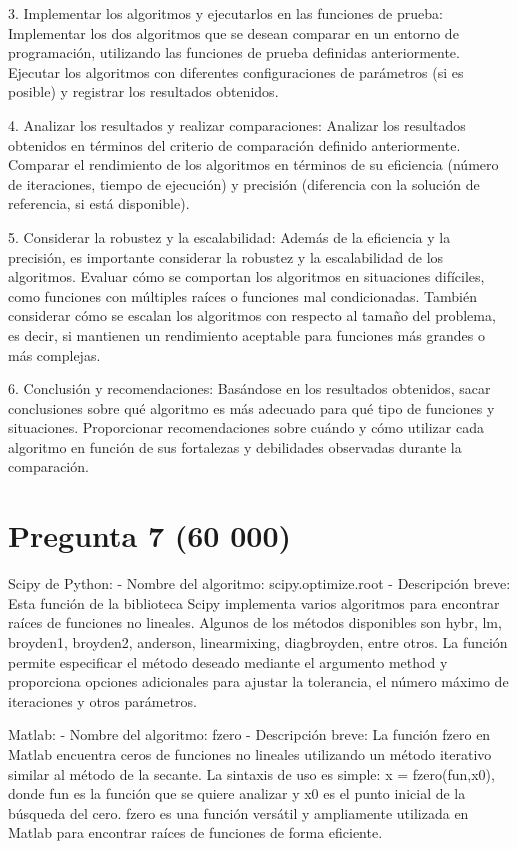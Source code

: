 \documentclass[a4paper,12pt]{article}
\begin{document}
3. Implementar los algoritmos y ejecutarlos en las funciones de prueba: Implementar los dos algoritmos que se desean comparar en un entorno de programación, utilizando las funciones de prueba definidas anteriormente. Ejecutar los algoritmos con diferentes configuraciones de parámetros (si es posible) y registrar los resultados obtenidos.

4. Analizar los resultados y realizar comparaciones: Analizar los resultados obtenidos en términos del criterio de comparación definido anteriormente. Comparar el rendimiento de los algoritmos en términos de su eficiencia (número de iteraciones, tiempo de ejecución) y precisión (diferencia con la solución de referencia, si está disponible).

5. Considerar la robustez y la escalabilidad: Además de la eficiencia y la precisión, es importante considerar la robustez y la escalabilidad de los algoritmos. Evaluar cómo se comportan los algoritmos en situaciones difíciles, como funciones con múltiples raíces o funciones mal condicionadas. También considerar cómo se escalan los algoritmos con respecto al tamaño del problema, es decir, si mantienen un rendimiento aceptable para funciones más grandes o más complejas.

6. Conclusión y recomendaciones: Basándose en los resultados obtenidos, sacar conclusiones sobre qué algoritmo es más adecuado para qué tipo de funciones y situaciones. Proporcionar recomendaciones sobre cuándo y cómo utilizar cada algoritmo en función de sus fortalezas y debilidades observadas durante la comparación.


\section*{Pregunta 7 (60 000)}
Scipy de Python:
- Nombre del algoritmo: scipy.optimize.root
- Descripción breve: Esta función de la biblioteca Scipy implementa varios algoritmos para encontrar raíces de funciones no lineales. Algunos de los métodos disponibles son hybr, lm, broyden1, broyden2, anderson, linearmixing, diagbroyden, entre otros. La función permite especificar el método deseado mediante el argumento method y proporciona opciones adicionales para ajustar la tolerancia, el número máximo de iteraciones y otros parámetros.

Matlab:
- Nombre del algoritmo: fzero
- Descripción breve: La función fzero en Matlab encuentra ceros de funciones no lineales utilizando un método iterativo similar al método de la secante. La sintaxis de uso es simple: x = fzero(fun,x0), donde fun es la función que se quiere analizar y x0 es el punto inicial de la búsqueda del cero. fzero es una función versátil y ampliamente utilizada en Matlab para encontrar raíces de funciones de forma eficiente.
\end{document}
